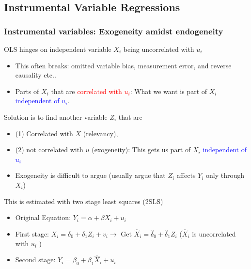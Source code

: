 \documentclass[aspectratio=169]{beamer}
\begin{document}
\subsection{Instrumental Variable Regressions}
\begin{frame}
\frametitle{Instrumental variables: Exogeneity amidst endogeneity} 
OLS hinges on independent variable $X_i$ being uncorrelated with $u_i$
 
\begin{itemize}\setlength\itemsep{3pt}
\item This often breaks: omitted variable bias, measurement error, and reverse causality etc..
\item Parts of $X_i$ that are \textcolor{red}{correlated with $u_i$}: What we want is part of $X_i$ \textcolor{blue}{independent of $u_i$}.
\end{itemize}\medskip
Solution is to find another variable $Z_i$ that are
\begin{itemize}\setlength\itemsep{3pt}
\item (1) Correlated with $X$ (relevancy), 
\item (2) not correlated with $u$ (exogeneity): This gets us part of $X_i$ \textcolor{blue}{independent of $u_i$}

\item Exogeneity is difficult to argue (usually argue that $Z_i$ affects $Y_i$ only through $X_i$)
\end{itemize}\medskip
This is estimated with two stage least squares (2SLS)
\begin{itemize}\setlength\itemsep{3pt}
\item Original Equation: $Y_i = \alpha + \beta X_i + u_i$
\item First stage: $X_i=\delta_0 + \delta_1Z_i+v_i \to$ Get $\widehat{X}_i=\hat{\delta}_0+\hat{\delta}_1Z_i$ ($\widehat{X}_i$ is uncorrelated with $u_i$ )
\item Second stage: $Y_i = \beta_0 + \beta_1 \widehat{X}_i + u_i$
\end{itemize}\medskip

\end{frame}
\end{document}
